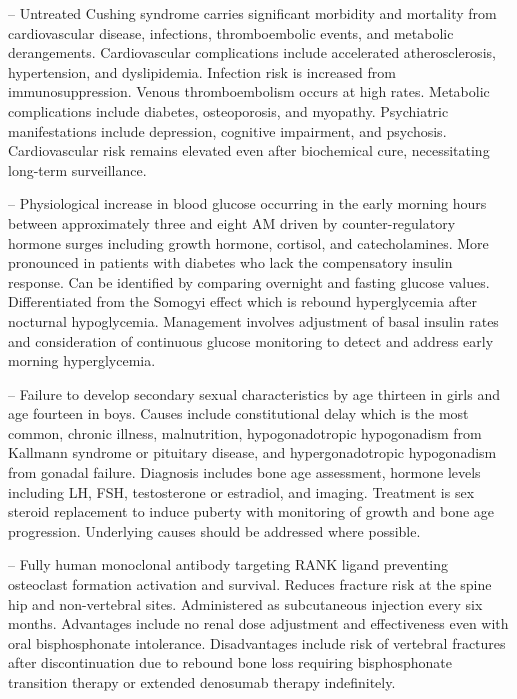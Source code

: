 -- Untreated Cushing syndrome carries significant morbidity and mortality from cardiovascular disease, infections, thromboembolic events, and metabolic derangements. Cardiovascular complications include accelerated atherosclerosis, hypertension, and dyslipidemia. Infection risk is increased from immunosuppression. Venous thromboembolism occurs at high rates. Metabolic complications include diabetes, osteoporosis, and myopathy. Psychiatric manifestations include depression, cognitive impairment, and psychosis. Cardiovascular risk remains elevated even after biochemical cure, necessitating long-term surveillance.

-- Physiological increase in blood glucose occurring in the early morning hours between approximately three and eight AM driven by counter-regulatory hormone surges including growth hormone, cortisol, and catecholamines. More pronounced in patients with diabetes who lack the compensatory insulin response. Can be identified by comparing overnight and fasting glucose values. Differentiated from the Somogyi effect which is rebound hyperglycemia after nocturnal hypoglycemia. Management involves adjustment of basal insulin rates and consideration of continuous glucose monitoring to detect and address early morning hyperglycemia.

-- Failure to develop secondary sexual characteristics by age thirteen in girls and age fourteen in boys. Causes include constitutional delay which is the most common, chronic illness, malnutrition, hypogonadotropic hypogonadism from Kallmann syndrome or pituitary disease, and hypergonadotropic hypogonadism from gonadal failure. Diagnosis includes bone age assessment, hormone levels including LH, FSH, testosterone or estradiol, and imaging. Treatment is sex steroid replacement to induce puberty with monitoring of growth and bone age progression. Underlying causes should be addressed where possible.

-- Fully human monoclonal antibody targeting RANK ligand preventing osteoclast formation activation and survival. Reduces fracture risk at the spine hip and non-vertebral sites. Administered as subcutaneous injection every six months. Advantages include no renal dose adjustment and effectiveness even with oral bisphosphonate intolerance. Disadvantages include risk of vertebral fractures after discontinuation due to rebound bone loss requiring bisphosphonate transition therapy or extended denosumab therapy indefinitely.

